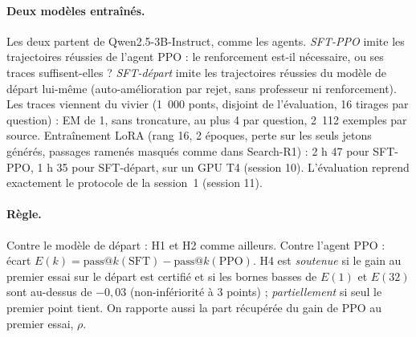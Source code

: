 \paragraph{Deux modèles entraînés.} Les deux partent de Qwen2.5-3B-Instruct, comme les agents. \emph{SFT-PPO} imite les trajectoires réussies de l'agent PPO : le renforcement est-il nécessaire, ou ses traces suffisent-elles ? \emph{SFT-départ} imite les trajectoires réussies du modèle de départ lui-même (auto-amélioration par rejet, sans professeur ni renforcement). Les traces viennent du vivier (1~000 ponts, disjoint de l'évaluation, 16 tirages par question) : EM de 1, sans troncature, au plus 4 par question, 2~112 exemples par source. Entraînement LoRA (rang 16, 2 époques, perte sur les seuls jetons générés, passages ramenés masqués comme dans Search-R1) : 2 h 47 pour SFT-PPO, 1 h 35 pour SFT-départ, sur un GPU T4 (session 10). L'évaluation reprend exactement le protocole de la session~1 (session 11).

\paragraph{Règle.} Contre le modèle de départ : H1 et H2 comme ailleurs. Contre l'agent PPO : écart $E(k) = \text{pass@}k(\text{SFT}) - \text{pass@}k(\text{PPO})$. H4 est \emph{soutenue} si le gain au premier essai sur le départ est certifié et si les bornes basses de $E(1)$ et $E(32)$ sont au-dessus de $-0{,}03$ (non-infériorité à 3 points) ; \emph{partiellement} si seul le premier point tient. On rapporte aussi la part récupérée du gain de PPO au premier essai, $\rho$.

\begin{table}[h]\centering\small
{}
\caption{H4 (amendement du 23 novembre) : fine-tuning supervisé sur des trajectoires réussies, 500 ponts, 32 tirages, IC à 95~\% par bootstrap des questions. $\rho$ : part du gain de PPO au premier essai récupérée. Verdict H4 : soutenue (SFT-PPO), partiellement (SFT-départ).}\label{tab:h4-p2}
\end{table}


